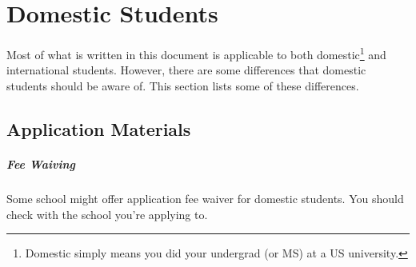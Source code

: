\documentclass[oneside,11pt]{memoir}
\begin{document}


\chapter{Domestic Students}\label{sec:domestic-students}

Most of what is written in this document is applicable to both domestic\footnote{Domestic simply means you did your undergrad (or MS) at a US university.} and international students.  However, there are some differences that domestic students should be aware of.  This section lists some of these differences.

\section{Application Materials}

\paragraph{Fee Waiving} Some school might offer application fee waiver for domestic students.  You should check with the school you're applying to. 
\end{document}
